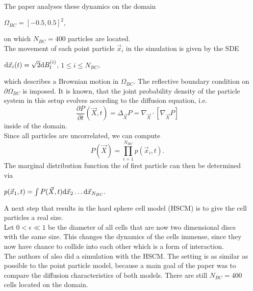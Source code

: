 The paper \cite{Bruna2012} analyses these dynamics on the domain 
\begin{center}
    $
    \Omega_{BC} = [-0.5, 0.5]^2,
    $
\end{center}
on which $N_{BC} = 400$ particles are located. \\
The movement of each point particle $\vec{x}_i$ in the simulation is given by the SDE
\begin{center}
    $\mathrm{d} \vec{x}_i(t) = \sqrt{2} \mathrm{d} B_t^{(i)}$, \hspace{0.5em} $1 \leq i \leq N_{BC}$,
\end{center}
which describes a Brownian motion in $\Omega_{BC}$.
The reflective boundary condition on $\partial \Omega_{BC}$ is imposed.
It is known, that the joint probability density of the particle system in this setup evolves according to the diffusion equation, i.e.
\begin{equation}
    \frac{\partial P}{\partial t}(\vec{X}, t) = \Delta_{\vec{X}} P = \nabla_{\vec{X}} \cdot [ \nabla_{\vec{X}} P]
    \label{eq:heat}
\end{equation}
inside of the domain. \\
Since all particles are uncorrelated, we can compute
\begin{equation}
    P(\vec{X}) = \prod_{i=1}^{N_{BC}} p(\vec{x}_i, t).
\end{equation}
The marginal distribution function the of first particle can then be determined via
\begin{center}
    $
    p(\vec{x}_1, t) = \int P(\vec{X}, t) \mathrm{d} \vec{x}_2 \dots  \mathrm{d} \vec{x}_{N_{BC}}.
    $
\end{center} 

A next step that results in the hard sphere cell model (HSCM) is to give the cell particles a real size. \\
Let $0 < \epsilon \ll 1$ be the diameter of all cells that are now two dimensional discs with the same size. 
This changes the dynamics of the cells immense, since they now have chance to collide into each other which is a form of interaction. \\
The authors of \cite{Bruna2012} also did a simulation with the HSCM. 
The setting is as similar as possible to the point particle model, because a main goal of the paper was to compare the diffusion characteristics of both models. 
There are still $N_{BC} = 400$ cells located on the domain. \\

